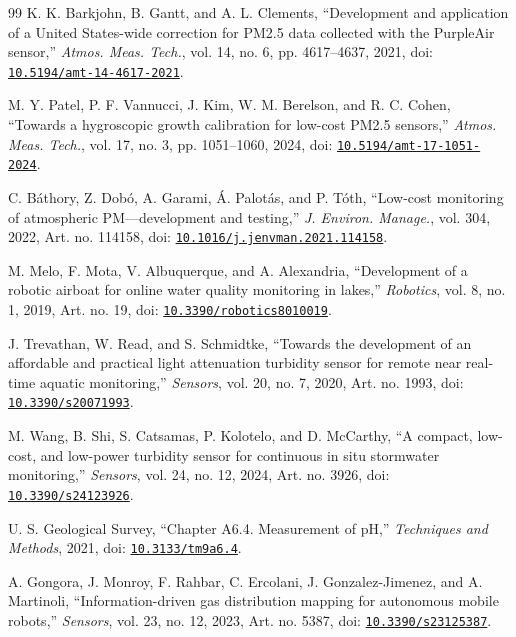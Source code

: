 \begin{thebibliography}{99}
K. K. Barkjohn, B. Gantt, and A. L. Clements, “Development and application of a United States-wide correction for PM2.5 data collected with the PurpleAir sensor,” \textit{Atmos. Meas. Tech.}, vol. 14, no. 6, pp. 4617--4637, 2021, doi: \href{https://doi.org/10.5194/amt-14-4617-2021}{\nolinkurl{10.5194/amt-14-4617-2021}}.

M. Y. Patel, P. F. Vannucci, J. Kim, W. M. Berelson, and R. C. Cohen, “Towards a hygroscopic growth calibration for low-cost PM2.5 sensors,” \textit{Atmos. Meas. Tech.}, vol. 17, no. 3, pp. 1051--1060, 2024, doi: \href{https://doi.org/10.5194/amt-17-1051-2024}{\nolinkurl{10.5194/amt-17-1051-2024}}.

C. Báthory, Z. Dobó, A. Garami, Á. Palotás, and P. Tóth, “Low-cost monitoring of atmospheric PM---development and testing,” \textit{J. Environ. Manage.}, vol. 304, 2022, Art. no. 114158, doi: \href{https://doi.org/10.1016/j.jenvman.2021.114158}{\nolinkurl{10.1016/j.jenvman.2021.114158}}.

M. Melo, F. Mota, V. Albuquerque, and A. Alexandria, “Development of a robotic airboat for online water quality monitoring in lakes,” \textit{Robotics}, vol. 8, no. 1, 2019, Art. no. 19, doi: \href{https://doi.org/10.3390/robotics8010019}{\nolinkurl{10.3390/robotics8010019}}.

J. Trevathan, W. Read, and S. Schmidtke, “Towards the development of an affordable and practical light attenuation turbidity sensor for remote near real-time aquatic monitoring,” \textit{Sensors}, vol. 20, no. 7, 2020, Art. no. 1993, doi: \href{https://doi.org/10.3390/s20071993}{\nolinkurl{10.3390/s20071993}}.

M. Wang, B. Shi, S. Catsamas, P. Kolotelo, and D. McCarthy, “A compact, low-cost, and low-power turbidity sensor for continuous in situ stormwater monitoring,” \textit{Sensors}, vol. 24, no. 12, 2024, Art. no. 3926, doi: \href{https://doi.org/10.3390/s24123926}{\nolinkurl{10.3390/s24123926}}.

U. S. Geological Survey, “Chapter A6.4. Measurement of pH,” \textit{Techniques and Methods}, 2021, doi: \href{https://doi.org/10.3133/tm9a6.4}{\nolinkurl{10.3133/tm9a6.4}}.

A. Gongora, J. Monroy, F. Rahbar, C. Ercolani, J. Gonzalez-Jimenez, and A. Martinoli, “Information-driven gas distribution mapping for autonomous mobile robots,” \textit{Sensors}, vol. 23, no. 12, 2023, Art. no. 5387, doi: \href{https://doi.org/10.3390/s23125387}{\nolinkurl{10.3390/s23125387}}.


\end{thebibliography}
